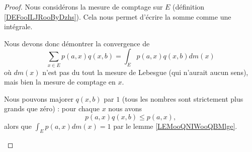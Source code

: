 \begin{proof}
	Nous considérons la mesure de comptage sur \( E\) (définition \ref{DEFooILJRooByDzhs}). Cela nous permet d'écrire la somme comme une intégrale.

	\begin{subproof}
		Nous devons donc démontrer la convergence de
		\begin{equation}        \label{EQooCNNCooGJRWyi}
			\sum_{x\in E}p(a,x)q(x,b)=\int_Ep(a,x)q(x,b)dm(x)
		\end{equation}
		où \( dm(x)\) n'est pas du tout la mesure de Lebesgue (qui n'aurait aucun sens), mais bien la mesure de comptage en \( x\).

		Nous pouvons majorer \( q(x,b)\) par \( 1\) (tous les nombres sont strictement plus grands que zéro) : pour chaque \( x\) nous avons
		\begin{equation}
			p(a,x)q(x,b)\leq p(a,x),
		\end{equation}
		alors que \( \int_Ep(a,x)dm(x)=1\) par le lemme \ref{LEMooQNIWooQBMlge}.


\end{subproof}
\end{proof}
